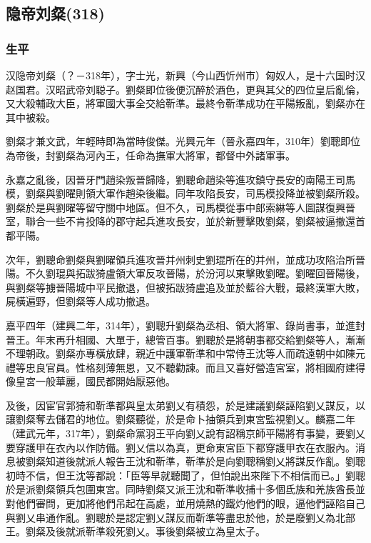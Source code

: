 
\subsection{隐帝刘粲\tiny(318)}

\subsubsection{生平}

汉隐帝刘粲（？－318年），字士光，新興（今山西忻州市）匈奴人，是十六国时汉赵国君。汉昭武帝刘聪子。劉粲即位後便沉醉於酒色，更與其父的四位皇后亂倫，又大殺輔政大臣，將軍國大事全交給靳準。最終令靳準成功在平陽叛亂，劉粲亦在其中被殺。

劉粲才兼文武，年輕時即為當時俊傑。光興元年（晉永嘉四年，310年）劉聰即位為帝後，封劉粲為河內王，任命為撫軍大將軍，都督中外諸軍事。

永嘉之亂後，因晉牙門趙染叛晉歸降，劉聰命趙染等進攻鎮守長安的南陽王司馬模，劉粲與劉曜則領大軍作趙染後繼。同年攻陷長安，司馬模投降並被劉粲所殺。劉粲於是與劉曜等留守關中地區。但不久，司馬模從事中郎索綝等人圖謀復興晉室，聯合一些不肯投降的郡守起兵進攻長安，並於新豐擊敗劉粲，劉粲被逼撤還首都平陽。

次年，劉聰命劉粲與劉曜領兵進攻晉并州刺史劉琨所在的并州，並成功攻陷治所晉陽。不久劉琨與拓跋猗盧領大軍反攻晉陽，於汾河以東擊敗劉曜。劉曜回晉陽後，與劉粲等擄晉陽城中平民撤退，但被拓跋猗盧追及並於藍谷大戰，最終漢軍大敗，屍橫遍野，但劉粲等人成功撤退。

嘉平四年（建興二年，314年），劉聰升劉粲為丞相、領大將軍、錄尚書事，並進封晉王。年末再升相國、大單于，總管百事。劉聰於是將朝事都交給劉粲等人，漸漸不理朝政。劉粲亦專橫放肆，親近中護軍靳準和中常侍王沈等人而疏遠朝中如陳元禮等忠良官員。性格刻薄無恩，又不聽勸諫。而且又喜好營造宮室，將相國府建得像皇宮一般華麗，國民都開始厭惡他。

及後，因宦官郭猗和靳準都與皇太弟劉乂有積怨，於是建議劉粲誣陷劉乂謀反，以讓劉粲奪去儲君的地位。劉粲聽從，於是命卜抽領兵到東宮監視劉乂。麟嘉二年（建武元年，317年），劉粲命黨羽王平向劉乂說有詔稱京師平陽將有事變，要劉乂要穿護甲在衣內以作防備。劉乂信以為真，更命東宮臣下都穿護甲衣在衣服內。消息被劉粲知道後就派人報告王沈和靳準，靳準於是向劉聰稱劉乂將謀反作亂。劉聰初時不信，但王沈等都說：「臣等早就聽聞了，但怕說出來陛下不相信而已。」劉聰於是派劉粲領兵包圍東宮。同時劉粲又派王沈和靳準收捕十多個氐族和羌族酋長並對他們審問，更加將他們吊起在高處，並用燒熱的鐵灼他們的眼，逼他們誣陷自己與劉乂串通作亂。劉聰於是認定劉乂謀反而靳準等盡忠於他，於是廢劉乂為北部王。劉粲及後就派靳準殺死劉乂。事後劉粲被立為皇太子。


